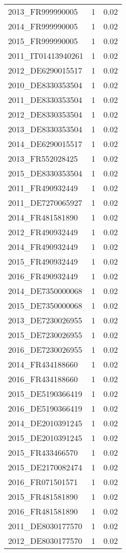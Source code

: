 \begin{table*}[htbp]
\begin{tabular}{lrr}
2013_FR999990005 & 1 & 0.02 \\
2014_FR999990005 & 1 & 0.02 \\
2015_FR999990005 & 1 & 0.02 \\
2011_IT01413940261 & 1 & 0.02 \\
2012_DE6290015517 & 1 & 0.02 \\
2010_DE8330353504 & 1 & 0.02 \\
2011_DE8330353504 & 1 & 0.02 \\
2012_DE8330353504 & 1 & 0.02 \\
2013_DE8330353504 & 1 & 0.02 \\
2014_DE6290015517 & 1 & 0.02 \\
2013_FR552028425 & 1 & 0.02 \\
2015_DE8330353504 & 1 & 0.02 \\
2011_FR490932449 & 1 & 0.02 \\
2011_DE7270065927 & 1 & 0.02 \\
2014_FR481581890 & 1 & 0.02 \\
2012_FR490932449 & 1 & 0.02 \\
2014_FR490932449 & 1 & 0.02 \\
2015_FR490932449 & 1 & 0.02 \\
2016_FR490932449 & 1 & 0.02 \\
2014_DE7350000068 & 1 & 0.02 \\
2015_DE7350000068 & 1 & 0.02 \\
2013_DE7230026955 & 1 & 0.02 \\
2015_DE7230026955 & 1 & 0.02 \\
2016_DE7230026955 & 1 & 0.02 \\
2014_FR434188660 & 1 & 0.02 \\
2016_FR434188660 & 1 & 0.02 \\
2015_DE5190366419 & 1 & 0.02 \\
2016_DE5190366419 & 1 & 0.02 \\
2014_DE2010391245 & 1 & 0.02 \\
2015_DE2010391245 & 1 & 0.02 \\
2015_FR433466570 & 1 & 0.02 \\
2015_DE2170082474 & 1 & 0.02 \\
2016_FR071501571 & 1 & 0.02 \\
2015_FR481581890 & 1 & 0.02 \\
2016_FR481581890 & 1 & 0.02 \\
2011_DE8030177570 & 1 & 0.02 \\
2012_DE8030177570 & 1 & 0.02 \\

\end{tabular}
\end{table*}
